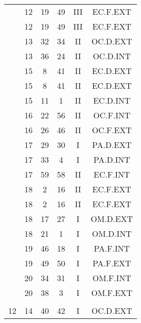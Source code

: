 \documentclass[12pt, a4paper]{article}
\begin{document}
\begin{multicols}{3}
{\begin{tabular}{c c c c c c}
	 	 	 	 & 12 & 19 & 49 & III & EC.F.EXT\\%
	 	 	 	 & 12 & 19 & 49 & III & EC.F.EXT\\%
	 	 	 	 & 13 & 32 & 34 & II & OC.D.EXT\\%
	 	 	 	 & 13 & 36 & 24 & II & OC.D.INT\\%
	 	 	 	 & 15 & 8 & 41 & II & EC.D.EXT\\%
	 	 	 	 & 15 & 8 & 41 & II & EC.D.EXT\\%
	 	 	 	 & 15 & 11 & 1 & II & EC.D.INT\\%
	 	 	 	 & 16 & 22 & 56 & II & OC.F.INT\\%
	 	 	 	 & 16 & 26 & 46 & II & OC.F.EXT\\%
	 	 	 	 & 17 & 29 & 30 & I & PA.D.EXT\\%
	 	 	 	 & 17 & 33 & 4 & I & PA.D.INT\\%
	 	 	 	 & 17 & 59 & 58 & II & EC.F.INT\\%
	 	 	 	 & 18 & 2 & 16 & II & EC.F.EXT\\%
	 	 	 	 & 18 & 2 & 16 & II & EC.F.EXT\\%
	 	 	 	 & 18 & 17 & 27 & I & OM.D.EXT\\%
	 	 	 	 & 18 & 21 & 1 & I & OM.D.INT\\%
	 	 	 	 & 19 & 46 & 18 & I & PA.F.INT\\%
	 	 	 	 & 19 & 49 & 50 & I & PA.F.EXT\\%
	 	 	 	 & 20 & 34 & 31 & I & OM.F.INT\\%
	 	 	 	 & 20 & 38 & 3 & I & OM.F.EXT\\%
	 	 	 	 & & & & & \\%
	 	 	 	12 & 14 & 40 & 42 & I & OC.D.EXT\\%
	 	 \end{tabular}
 	}
\end{multicols}
\end{document}
